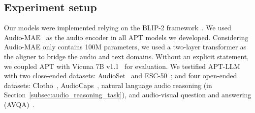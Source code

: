 \begin{table}[t]
\centering
\caption{Zero-shot performance comparison with audio language models. We group the methods in terms of their training strategy. ``\#Params.'' denotes the number of trainable parameters and ``\#Pairs'' represents the number of audio-text pairs. $\uparrow$ indicates the higher number, the better performance.}
\vspace{1em}
\label{tab.:existing_tasks}
\end{table}

\subsection{Experiment setup} \label{subsec:experiment_setup}
Our models were implemented relying on the BLIP-2 framework~\citep{li_blip-2_2023}. We used Audio-MAE~\citep{huang_masked_2022} as the audio encoder in all APT models we developed. Considering Audio-MAE only contains 100M parameters, we used a two-layer transformer as the aligner to bridge the audio and text domains. Without an explicit statement, we coupled APT with Vicuna 7B v1.1~\citep{chiang_vicuna_2023} for evaluation. We testified APT-LLM with two close-ended datasets: AudioSet~\citep{gemmeke_audio_2017} and ESC-50~\citep{piczak_esc_2015}; and four open-ended datasets: Clotho~\citep{drossos_clotho_2020}, AudioCaps~\citep{kim_audiocaps_2019}, natural language audio reasoning (in Section~\ref{subsec:audio_reasoning_task}), and audio-visual question and answering (AVQA)~\citep{yang_avqa_2022}.

